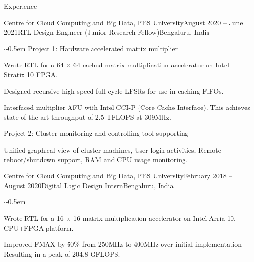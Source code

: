 \documentclass{CV} %
\begin{document}




\begin{rSection}{Experience}
  \begin{rSubsection}{Centre for Cloud Computing and Big Data, PES University}{August 2020 -- June 2021}{RTL Design Engineer (Junior Research Fellow)}{Bengaluru, India}
    \begin{list}{$\cdot$}{\footnotesize}\itemsep -0.5em \vspace{-0.5em}
      Project 1: Hardware accelerated matrix multiplier
    \item Wrote RTL for a 64 × 64 cached matrix-multiplication accelerator on Intel Stratix 10 FPGA.
    \item Designed recursive high-speed full-cycle LFSRs for use in caching FIFOs.
    \item  Interfaced multiplier AFU with Intel CCI-P (Core Cache Interface).
      This achieves state-of-the-art throughput of 2.5 TFLOPS at 309MHz.


      Project 2: Cluster monitoring and controlling tool supporting
      \item Unified graphical view of cluster machines, User login activities, Remote reboot/shutdown support, RAM and CPU usage monitoring.
    \end{list}
  \end{rSubsection}

  \begin{rSubsection}{Centre for Cloud Computing and Big Data, PES University}{February 2018 -- August 2020}{Digital Logic Design Intern}{Bengaluru, India}
    \begin{list}{$\cdot$}{\footnotesize}\itemsep -0.5em \vspace{-0.5em}
    \item Wrote RTL for a 16 × 16 matrix-multiplication accelerator on Intel Arria 10, CPU+FPGA platform.
    \item Improved FMAX by 60\% from 250MHz to 400MHz over initial implementation Resulting in a peak of 204.8 GFLOPS.


\end{list}
\end{rSubsection}
\end{rSection}
\end{document}
